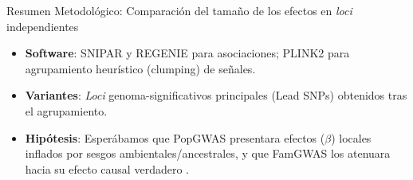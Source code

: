 
\begin{frame}[c]{Resumen Metodológico: Comparación del tamaño de los efectos en \textit{loci} independientes}
  \begin{itemize}
    \setlength\itemsep{1em}
    \item \textbf{Software}: SNIPAR y REGENIE para asociaciones; PLINK2 para agrupamiento heurístico (clumping) de señales.
    \item \textbf{Variantes}: \textit{Loci} genoma-significativos principales (Lead SNPs) obtenidos tras el agrupamiento.
    \item \textbf{Hipótesis}: Esperábamos que PopGWAS presentara efectos ($\beta$) locales inflados por sesgos ambientales/ancestrales, y que FamGWAS los atenuara hacia su efecto causal verdadero \parencite{guan2025-fgwas}.
  \end{itemize}
\end{frame}


